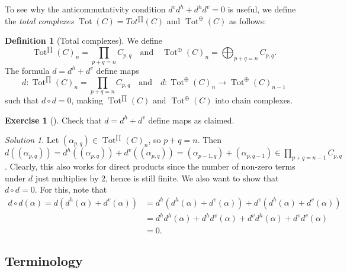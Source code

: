 \documentclass[reqno]{amsart}
\theoremstyle{definition}
\newtheorem{definition}[theorem]{Definition}
\newtheorem{exercise}[theorem]{Exercise}
\theoremstyle{remark}
\newtheorem*{solution}{Solution}
\DeclareMathOperator{\Tot}{Tot}
\begin{document}
To see why the anticommutativity condition
$d^{v} d^{h} + d^{h} d^{v} = 0$ is useful,
we define the \textit{total complexes} 
$\Tot (C) = Tot^{\prod} (C)$ and
$\Tot^{\oplus} (C)$ as follows:

 \begin{definition}[Total complexes]
    We define
    \[
        \Tot^{\prod}(C)_n = 
        \prod_{p+q=n}C_{p,q} \quad
        \text{and} \quad
        \Tot^{\oplus} (C)_n = 
        \bigoplus_{p+q=n}C_{p,q}.
    \] 
    The formula $d = d^{h} + d^{v}$ define maps
    \[
        d \colon \Tot^{\prod} (C)_n = 
        \prod_{p+q = n} C_{p,q} \quad \text{and} \quad
        d \colon \Tot^{\oplus}(C)_n \to 
        \Tot^{\oplus} (C)_{n-1}
    \] 
    such that $d \circ d = 0$, making
    $\Tot^{\prod}(C)$ and
    $\Tot^{\oplus}(C)$ into chain complexes.
\end{definition}

\begin{exercise}[]
    Check that $d = d^{h} + d^{v}$ define maps as
    claimed.
\end{exercise}

\begin{solution}
    Let
    $\left( \alpha_{p,q} \right) 
    \in \Tot^{\prod}(C)_n$, so
    $p+q = n$. Then
    $d \left( \left( \alpha_{p,q} \right)  \right) 
    = d^{h} \left( \left( \alpha_{p,q} \right)  \right) 
    + d^{v} \left( \left( \alpha_{p,q} \right)  \right) 
    = \left( \alpha_{p-1,q} \right) 
    + \left( \alpha_{p,q-1} \right) \in 
    \prod_{p+q=n-1} C_{p,q}$.
    Clearly, this also works for
    direct products since the number of non-zero terms 
    under $d$ just multiplies by $2$, hence is still finite.
    We also want to show that
    $d \circ d = 0$. For this, note that
    \begin{align*}
        d \circ d \left( \alpha \right) =
    d \left( d^{h} (\alpha) + d^{v}(\alpha) \right) 
    &= d^{h} \left( d^{h}(\alpha) + 
    d^{v} (\alpha) \right) +
    d^{v} \left( d^{h}(\alpha) + d^{v}(\alpha) \right)\\
    &= d^{h}d^{h} (\alpha) + d^{h} d^{v}(\alpha)
+ d^{v} d^{h}(\alpha) + d^{v} d^{v} (\alpha) \\
    &= 0.
    \end{align*}
\end{solution}



\subsection{Terminology}
\end{document}
